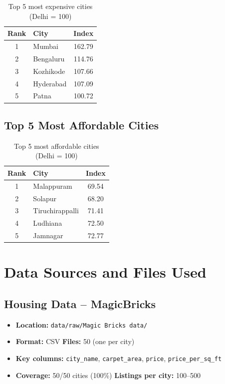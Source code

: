 \documentclass[12pt,a4paper]{article}
\begin{document}
\begin{table}[H]
  \centering
  \begin{tabular}{clc}
    \toprule
    \textbf{Rank} & \textbf{City} & \textbf{Index} \\
    \midrule
    1 & Mumbai      & 162.79 \\
    2 & Bengaluru   & 114.76 \\
    3 & Kozhikode   & 107.66 \\
    4 & Hyderabad   & 107.09 \\
    5 & Patna       & 100.72 \\
    \bottomrule
  \end{tabular}
  \caption{Top 5 most expensive cities (Delhi = 100)}
\end{table}

\subsection{Top 5 Most Affordable Cities}

\begin{table}[H]
  \centering
  \begin{tabular}{clc}
    \toprule
    \textbf{Rank} & \textbf{City} & \textbf{Index} \\
    \midrule
    1 & Malappuram      & 69.54 \\
    2 & Solapur         & 68.20 \\
    3 & Tiruchirappalli & 71.41 \\
    4 & Ludhiana        & 72.50 \\
    5 & Jamnagar        & 72.77 \\
    \bottomrule
  \end{tabular}
  \caption{Top 5 most affordable cities (Delhi = 100)}
\end{table}

\section{Data Sources and Files Used}

\subsection{Housing Data -- MagicBricks}

\begin{itemize}[leftmargin=*]
  \item \textbf{Location:} \texttt{data/raw/Magic Bricks data/}
  \item \textbf{Format:} CSV \quad \textbf{Files:} 50 (one per city)
  \item \textbf{Key columns:} \texttt{city\_name}, \texttt{carpet\_area}, \texttt{price}, \texttt{price\_per\_sq\_ft}
  \item \textbf{Coverage:} 50/50 cities (100\%) \quad \textbf{Listings per city:} 100--500
\end{itemize}
\end{document}
